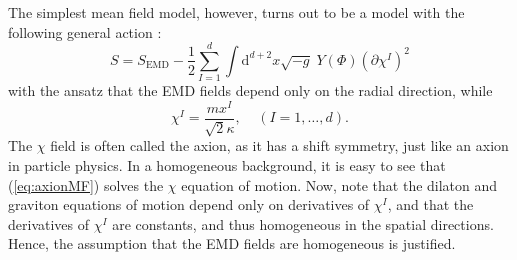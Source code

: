\documentclass[10pt, oneside]{book}
\begin{document}
\begin{doublespace}
The simplest mean field model, however, turns out to be a model with the following general action \cite{Andrade:2013gsa}: \begin{equation}
S = S_{\mathrm{EMD}} - \frac{1}{2}  \sum_{I=1}^d \int \mathrm{d}^{d+2}x \sqrt{-g} \; Y(\Phi) (\partial \chi^I)^2
\end{equation}
with the ansatz that the EMD fields depend only on the radial direction, while \begin{equation}
\chi^I =  \frac{mx^I}{\sqrt{2}\kappa},\;\;\;\; (I=1,\ldots,d).   \label{eq:axionMF}
\end{equation}
The $\chi$ field is often called the axion, as it has a shift symmetry, just like an axion in particle physics.   In a homogeneous background, it is easy to see that (\ref{eq:axionMF}) solves the $\chi$ equation of motion.    Now, note that the dilaton and graviton equations of motion depend only on derivatives of $\chi^I$, and that the derivatives of $\chi^I$ are constants, and thus homogeneous in the spatial directions.   Hence, the assumption that the EMD fields are homogeneous is justified.


\end{doublespace}
\end{document}
